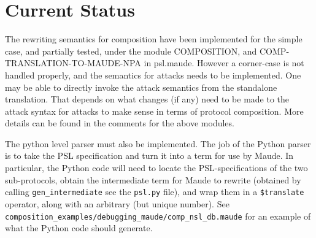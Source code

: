 \documentclass{article}
\begin{document}
\section{Current Status}

The rewriting semantics for composition have been implemented for the simple case, and partially tested, under the module 
COMPOSITION, and COMP-TRANSLATION-TO-MAUDE-NPA in psl.maude. However a corner-case is not handled properly, and the semantics for
attacks needs to be implemented. One may be able to directly invoke the attack semantics from the standalone translation. That
depends on what changes (if any) need to be made to the attack syntax for attacks to make sense in terms of protocol composition. 
More details can be found in the comments for the above modules.

The python level parser must also be implemented. The job of the Python parser is to take the PSL specification and turn it into a 
term for use by Maude. In particular, the Python code will need to locate the PSL-specifications of the two sub-protocols, obtain
the intermediate term for Maude to rewrite (obtained by calling \verb|gen_intermediate| see the \verb|psl.py| file), and wrap them
in a \verb|$translate| operator, along with an arbitrary (but unique number). 
See \verb|composition_examples/debugging_maude/comp_nsl_db.maude| for an example of what the Python code should generate.
\end{document}

